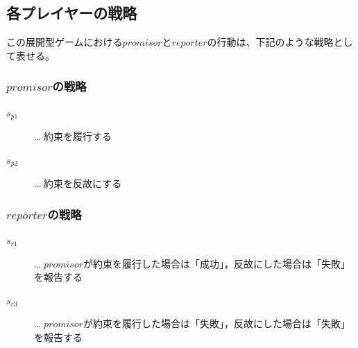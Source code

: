 \clearpage


\subsection{各プレイヤーの戦略}
この展開型ゲームにおける$promisor$と$reporter$の行動は、下記のような戦略として表せる。

\subsubsection{$promisor$の戦略}
\begin{description}
  \item[$s_{p1}$]… 約束を履行する
  \item[$s_{p2}$]… 約束を反故にする
\end{description}

\subsubsection{$reporter$の戦略}
\begin{description}
  \item[$s_{r1}$]… $promisor$が約束を履行した場合は「成功」，反故にした場合は「失敗」を報告する
  \item[$s_{r3}$]… $promisor$が約束を履行した場合は「失敗」，反故にした場合は「失敗」を報告する
\end{description}



